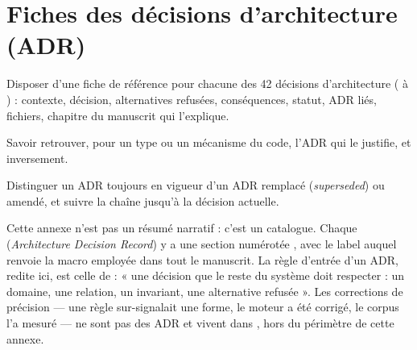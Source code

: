 \chapter{Fiches des décisions d'architecture (ADR)}
\label{chap:fiches-adr}

\begin{objectifs}
  \item Disposer d'une fiche de référence pour chacune des 42 décisions d'architecture ( à ) : contexte, décision, alternatives refusées, conséquences, statut, ADR liés, fichiers, chapitre du manuscrit qui l'explique.
  \item Savoir retrouver, pour un type ou un mécanisme du code, l'ADR qui le justifie, et inversement.
  \item Distinguer un ADR toujours en vigueur d'un ADR remplacé (\emph{superseded}) ou amendé, et suivre la chaîne jusqu'à la décision actuelle.
\end{objectifs}


Cette annexe n'est pas un résumé narratif : c'est un catalogue. Chaque
 (\emph{Architecture Decision Record}) y a une section numérotée
, avec le label  auquel renvoie la macro
 employée dans tout le manuscrit. La règle
d'entrée d'un ADR, redite ici, est celle de  : « une
décision que le reste du système doit respecter : un domaine, une relation, un
invariant, une alternative refusée ». Les corrections de précision — une règle
sur-signalait une forme, le moteur a été corrigé, le corpus l'a mesuré — ne
sont pas des ADR et vivent dans , hors du
périmètre de cette annexe.

